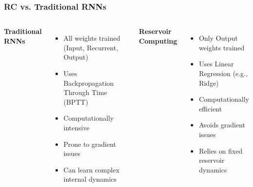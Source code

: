\documentclass{beamer}
\begin{document}
\begin{frame}
  \frametitle{RC vs. Traditional RNNs}
  \begin{columns}[T]
        \textbf{Traditional RNNs}
        \begin{itemize}
            \item All weights trained (Input, Recurrent, Output)
            \item Uses Backpropagation Through Time (BPTT)
            \item Computationally intensive
            \item Prone to gradient issues
            \item Can learn complex internal dynamics
        \end{itemize}
        \textbf{Reservoir Computing}
        \begin{itemize}
            \item Only Output weights trained
            \item Uses Linear Regression (e.g., Ridge)
            \item Computationally efficient
            \item Avoids gradient issues
            \item Relies on fixed reservoir dynamics
        \end{itemize}
  \end{columns}
\end{frame}
\end{document}
